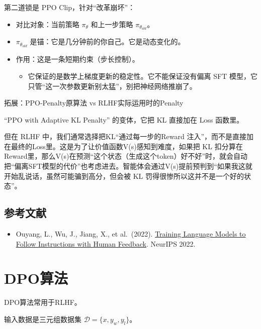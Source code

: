 第二道锁是 PPO Clip，针对``改革崩坏''：

\begin{itemize}
\tightlist
\item
  对比对象：当前策略 \(\pi_\theta\) 和上一步策略 \(\pi_{\theta_{old}}\)。
\item
  \(\pi_{\theta_{old}}\) 是锚：它是几分钟前的你自己。它是动态变化的。
\item
  作用：这是一条短期约束（步长控制）。

  \begin{itemize}
  \tightlist
  \item
    它保证的是数学上梯度更新的稳定性。它不能保证没有偏离 SFT 模型，它只管``这一次参数更新别太猛''，别把神经网络推崩了。
  \end{itemize}
\end{itemize}

拓展：PPO-Penalty原算法 vs RLHF实际运用时的Penalty

``PPO with Adaptive KL Penalty'' 的变体，它把 KL 直接加在 Loss 函数里。

但在 RLHF 中，我们通常选择把KL``通过每一步的Reward 注入''，而不是直接加在最终的Loss里。这是为了让价值函数V(s)感知到难度，如果把 KL 扣分算在Reward里，那么V(s)在预测``这个状态（生成这个token）好不好''时，就会自动把``偏离SFT模型的代价''也考虑进去。智能体会通过V(s)提前预判到``如果我这就开始乱说话，虽然可能骗到高分，但会被 KL 罚得很惨所以这并不是一个好的状态''。

\hypertarget{ux53c2ux8003ux6587ux732e-77}{%
\subsection{参考文献}\label{ux53c2ux8003ux6587ux732e-77}}

\begin{itemize}
\tightlist
\item
  Ouyang, L., Wu, J., Jiang, X., et al.~(2022). \href{https://arxiv.org/abs/2203.02155}{Training Language Models to Follow Instructions with Human Feedback}. NeurIPS 2022.
\end{itemize}

\clearpage

\hypertarget{dpoux7b97ux6cd5}{%
\section{DPO算法}\label{dpoux7b97ux6cd5}}

DPO算法常用于RLHF。

输入数据是三元组数据集 \(\mathcal{D}=\{x,y_w,y_l\}\)。

